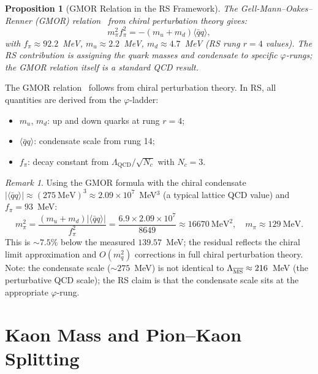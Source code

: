 \documentclass[12pt,a4paper]{article}
\newtheorem{proposition}[theorem]{Proposition}
\theoremstyle{definition}
\theoremstyle{remark}
\newtheorem{remark}[theorem]{Remark}
\begin{document}
\begin{proposition}[GMOR Relation in the RS Framework]
\label{thm:gmor}
The Gell-Mann--Oakes--Renner (GMOR) relation~\cite{GMOR1968} from chiral
perturbation theory gives:
\begin{equation}
m_\pi^2 f_\pi^2 = -(m_u + m_d)\langle\bar{q}q\rangle,
\end{equation}
with $f_\pi \approx 92.2$~MeV, $m_u \approx 2.2$~MeV, $m_d \approx 4.7$~MeV
(RS rung $r = 4$ values).  The RS contribution is assigning the quark
masses and condensate to specific $\varphi$-rungs; the GMOR relation
itself is a standard QCD result.
\end{proposition}

The GMOR relation~\cite{GMOR1968} follows from chiral perturbation
theory.  In RS, all quantities are derived from the $\varphi$-ladder:
\begin{itemize}[nosep]
  \item $m_u$, $m_d$: up and down quarks at rung $r = 4$;
  \item $\langle\bar{q}q\rangle$: condensate scale from rung 14;
  \item $f_\pi$: decay constant from $\Lambda_{\mathrm{QCD}}/\sqrt{N_c}$
  with $N_c = 3$.
\end{itemize}

\begin{remark}
Using the GMOR formula with the chiral condensate
$|\langle\bar{q}q\rangle| \approx (275~\mathrm{MeV})^3 \approx
2.09 \times 10^7$~MeV$^3$ (a typical lattice QCD value) and
$f_\pi = 93$~MeV:
\begin{equation}
  m_\pi^2 = \frac{(m_u + m_d)|\langle\bar{q}q\rangle|}{f_\pi^2}
  = \frac{6.9 \times 2.09 \times 10^7}{8649}
  \approx 16670~\mathrm{MeV}^2,
  \quad m_\pi \approx 129~\mathrm{MeV}.
\end{equation}
This is $\sim 7.5\%$ below the measured $139.57$~MeV; the residual
reflects the chiral limit approximation and $O(m_q^2)$ corrections
in full chiral perturbation theory.  Note: the condensate scale
($\sim 275$~MeV) is not identical to $\Lambda_{\overline{\rm MS}}
\approx 216$~MeV (the perturbative QCD scale); the RS claim is that
the condensate scale sits at the appropriate $\varphi$-rung.
\end{remark}

\section{Kaon Mass and Pion--Kaon Splitting}
\label{sec:kaon}
\end{document}
